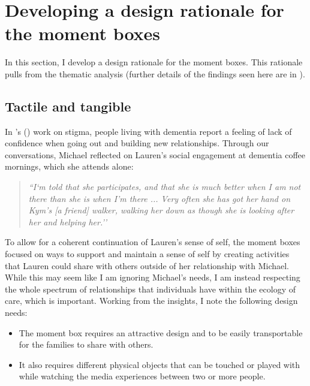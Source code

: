 \section{Developing a design rationale for the moment boxes}
\label{DesignRationale}
In this section, I develop a design rationale for the moment boxes. This rationale pulls from the thematic analysis (further details of the findings seen here are in \citep{hodge_exploring_2019}). 

\subsection{Tactile and tangible}
\label{DR:TactileTangible}
In \citeauthor{nolan_perceptions_2006}'s (\citeyear{nolan_perceptions_2006}) work on stigma, people living with dementia report a feeling of lack of confidence when going out and building new relationships. Through our conversations, Michael reflected on Lauren's social engagement at dementia coffee mornings, which she attends alone:

\begin{quote}
\textit{    ``I`m told that she participates, and that she is much better when I am not there than she is when I’m there ... Very often she has got her hand on Kym’s [a friend] walker, walking her down as though she is looking after her and helping her.''
}
\end{quote}

To allow for a coherent continuation of Lauren’s sense of self, the moment boxes focused on ways to support and maintain a sense of self by creating activities that Lauren could share with others outside of her relationship with Michael. While this may seem like I am ignoring Michael’s needs, I am instead respecting the whole spectrum of relationships that individuals have within the ecology of care, which is important. Working from the insights, I note the following design needs:
\begin{itemize}
    \item The moment box requires an attractive design and to be easily transportable for the families to share with others.
    \item It also requires different physical objects that can be touched or played with while watching the media experiences between two or more people. 
\end{itemize}

